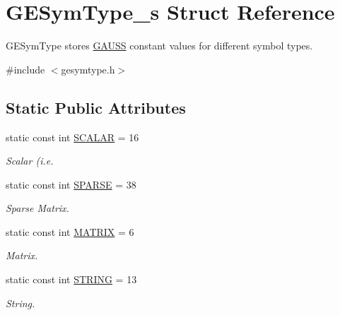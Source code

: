 \hypertarget{struct_g_e_sym_type__s}{}\section{G\+E\+Sym\+Type\+\_\+s Struct Reference}
\label{struct_g_e_sym_type__s}


G\+E\+Sym\+Type stores \hyperlink{class_g_a_u_s_s}{G\+A\+U\+SS} constant values for different symbol types.  




{\ttfamily \#include $<$gesymtype.\+h$>$}

\subsection*{Static Public Attributes}
\begin{DoxyCompactItemize}
\item 
static const int \hyperlink{struct_g_e_sym_type__s_a4868e0d2833270b164c4a78b497f4fdc}{S\+C\+A\+L\+AR} = 16
\begin{DoxyCompactList}\small\item\em Scalar (i.\+e. \end{DoxyCompactList}\item 
\mbox{\label{struct_g_e_sym_type__s_a17bff9bfcefd9f4c639d20d256f20a7d}} 
static const int \hyperlink{struct_g_e_sym_type__s_a17bff9bfcefd9f4c639d20d256f20a7d}{S\+P\+A\+R\+SE} = 38
\begin{DoxyCompactList}\small\item\em Sparse Matrix. \end{DoxyCompactList}\item 
\mbox{\label{struct_g_e_sym_type__s_a3874c4c2df1ed454c13722031e582f66}} 
static const int \hyperlink{struct_g_e_sym_type__s_a3874c4c2df1ed454c13722031e582f66}{M\+A\+T\+R\+IX} = 6
\begin{DoxyCompactList}\small\item\em Matrix. \end{DoxyCompactList}\item 
\mbox{\label{struct_g_e_sym_type__s_a0e719c96f22a8453e460f7d87a09696a}} 
static const int \hyperlink{struct_g_e_sym_type__s_a0e719c96f22a8453e460f7d87a09696a}{S\+T\+R\+I\+NG} = 13
\begin{DoxyCompactList}\small\item\em String. \end{DoxyCompactList}\item 

\end{DoxyCompactItemize}
